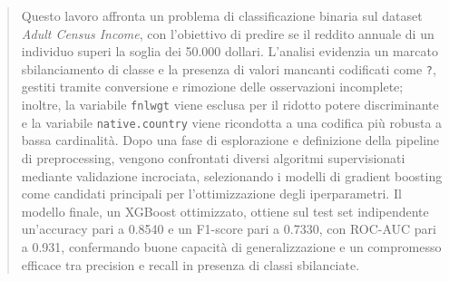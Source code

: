 \documentclass[a4paper,11pt]{article}
\begin{document}
\begin{titlepage}
\end{titlepage}

\newpage
\pagestyle{fancy}


\begin{abstract}
\noindent Questo lavoro affronta un problema di classificazione binaria sul dataset \textit{Adult Census Income}, con l’obiettivo di predire se il reddito annuale di un individuo superi la soglia dei 50.000 dollari.
L’analisi evidenzia un marcato sbilanciamento di classe e la presenza di valori mancanti codificati come \texttt{?}, gestiti tramite conversione e rimozione delle osservazioni incomplete; inoltre, la variabile \texttt{fnlwgt} viene esclusa per il ridotto potere discriminante e la variabile \texttt{native.country} viene ricondotta a una codifica più robusta a bassa cardinalità.
Dopo una fase di esplorazione e definizione della pipeline di preprocessing, vengono confrontati diversi algoritmi supervisionati mediante validazione incrociata, selezionando i modelli di gradient boosting come candidati principali per l’ottimizzazione degli iperparametri.
Il modello finale, un XGBoost ottimizzato, ottiene sul test set indipendente un’accuracy pari a 0.8540 e un F1-score pari a 0.7330, con ROC-AUC pari a 0.931, confermando buone capacità di generalizzazione e un compromesso efficace tra precision e recall in presenza di classi sbilanciate.
\end{abstract}
\end{document}
